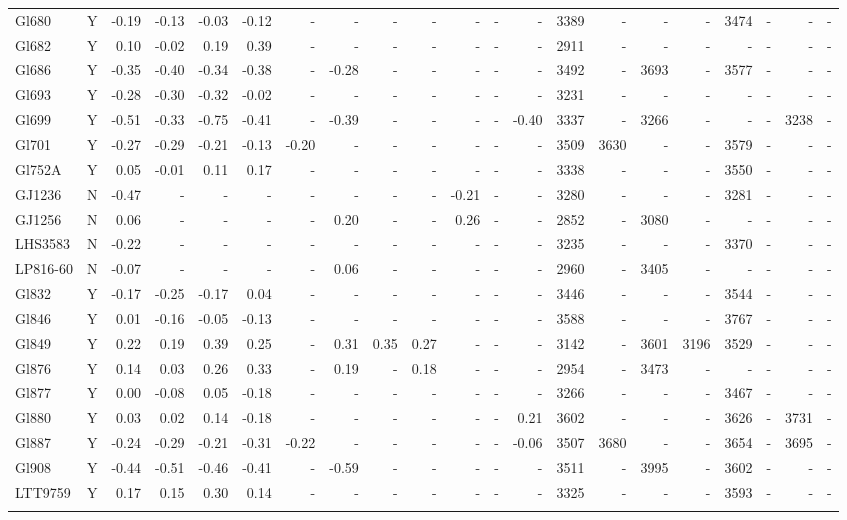 \documentclass{aa}
\begin{document}
{\begin{landscape}
{\begin{longtable}{l c r r r r r r r r r r r | r r r r r r r r }
Gl680 & Y & -0.19 & -0.13 & -0.03 & -0.12 & - & - & - & - & - & - & - & 3389 & - & - & - & 3474 & - & - & - \\
Gl682 & Y & 0.10 & -0.02 & 0.19 & 0.39 & - & - & - & - & - & - & - & 2911 & - & - & - & - & - & - & - \\
Gl686 & Y & -0.35 & -0.40 & -0.34 & -0.38 & - & -0.28 & - & - & - & - & - & 3492 & - & 3693 & - & 3577 & - & - & - \\
Gl693 & Y & -0.28 & -0.30 & -0.32 & -0.02 & - & - & - & - & - & - & - & 3231 & - & - & - & - & - & - & - \\
Gl699 & Y & -0.51 & -0.33 & -0.75 & -0.41 & - & -0.39 & - & - & - & - & -0.40 & 3337 & - & 3266 & - & - & - & 3238 & - \\
Gl701 & Y & -0.27 & -0.29 & -0.21 & -0.13 & -0.20 & - & - & - & - & - & - & 3509 & 3630 & - & - & 3579 & - & - & - \\
Gl752A & Y & 0.05 & -0.01 & 0.11 & 0.17 & - & - & - & - & - & - & - & 3338 & - & - & - & 3550 & - & - & - \\
GJ1236 & N & -0.47 & - & - & - & - & - & - & - & -0.21 & - & - & 3280 & - & - & - & 3281 & - & - & - \\
GJ1256 & N & 0.06 & - & - & - & - & 0.20 & - & - & 0.26 & - & - & 2852 & - & 3080 & - & - & - & - & - \\
LHS3583 & N & -0.22 & - & - & - & - & - & - & - & - & - & - & 3235 & - & - & - & 3370 & - & - & - \\
LP816-60 & N & -0.07 & - & - & - & - & 0.06 & - & - & - & - & - & 2960 & - & 3405 & - & - & - & - & - \\
Gl832 & Y & -0.17 & -0.25 & -0.17 & 0.04 & - & - & - & - & - & - & - & 3446 & - & - & - & 3544 & - & - & - \\
Gl846 & Y & 0.01 & -0.16 & -0.05 & -0.13 & - & - & - & - & - & - & - & 3588 & - & - & - & 3767 & - & - & - \\
Gl849 & Y & 0.22 & 0.19 & 0.39 & 0.25 & - & 0.31 & 0.35 & 0.27 & - & - & - & 3142 & - & 3601 & 3196 & 3529 & - & - & - \\
Gl876 & Y & 0.14 & 0.03 & 0.26 & 0.33 & - & 0.19 & - & 0.18 & - & - & - & 2954 & - & 3473 & - & - & - & - & - \\
Gl877 & Y & 0.00 & -0.08 & 0.05 & -0.18 & - & - & - & - & - & - & - & 3266 & - & - & - & 3467 & - & - & - \\
Gl880 & Y & 0.03 & 0.02 & 0.14 & -0.18 & - & - & - & - & - & - & 0.21 & 3602 & - & - & - & 3626 & - & 3731 & - \\
Gl887 & Y & -0.24 & -0.29 & -0.21 & -0.31 & -0.22 & - & - & - & - & - & -0.06 & 3507 & 3680 & - & - & 3654 & - & 3695 & - \\
Gl908 & Y & -0.44 & -0.51 & -0.46 & -0.41 & - & -0.59 & - & - & - & - & - & 3511 & - & 3995 & - & 3602 & - & - & - \\
LTT9759 & Y & 0.17 & 0.15 & 0.30 & 0.14 & - & - & - & - & - & - & - & 3325 & - & - & - & 3593 & - & - & - \\
\label{table:compfull}
\end{longtable}}
\end{landscape}
}
\end{document}
